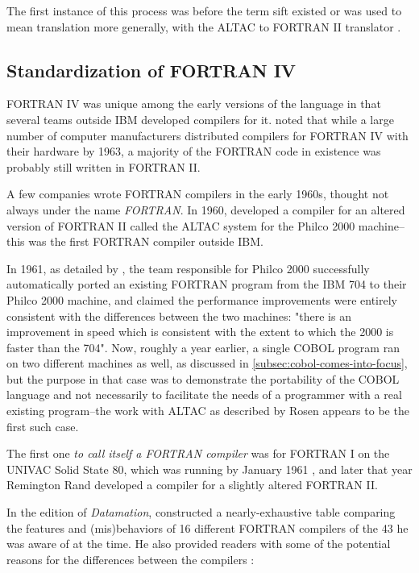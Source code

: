 The first instance of this process was before the term \gls{sift}
existed or was used to mean translation more generally, with
the ALTAC to FORTRAN II translator \cite{olsen_altac_fortranii_translator_1965}.

\subsection{Standardization of FORTRAN IV}

FORTRAN IV was unique among the early versions of the language in that
several teams outside IBM developed compilers for it.
\citeauthor{backus_heising_fortran_1964} noted that while a large number
of computer manufacturers distributed compilers for FORTRAN IV with
their hardware by 1963, a majority of the FORTRAN code in existence
was probably still written in FORTRAN II\cite{backus_heising_fortran_1964}.

A few companies wrote FORTRAN compilers in the early 1960s,
thought not always under the name \textit{FORTRAN}.
In 1960,  developed a compiler for
an altered version of FORTRAN II called the ALTAC system
for the Philco 2000 machine\cite{sammet_programming_languages_history_and_fundamentals_1969}--
this was the first FORTRAN compiler outside IBM.

In 1961, as detailed by \citeauthor{rosen_altac_fortran_1961},
the team responsible for Philco 2000 successfully automatically
ported an existing FORTRAN program from the IBM 704 to their Philco 2000
machine, and claimed the performance improvements were entirely consistent with
the differences between the two machines: "there is an improvement in speed which is consistent
with the extent to which the 2000 is faster than the 704"\cite{rosen_altac_fortran_1961}.
Now, roughly a year earlier, a single COBOL program ran on two different
machines as well, as discussed in \cref{subsec:cobol-comes-into-focus},
but the purpose in that case was to demonstrate the portability of the COBOL
language and not necessarily to facilitate the needs of a programmer with
a real existing program--the work with ALTAC as described by Rosen
appears to be the first such case.

The first one
\textit{to call itself a FORTRAN compiler} was for FORTRAN I
on the UNIVAC Solid State 80, which was running by January 1961
\cite{sammet_programming_languages_history_and_fundamentals_1969},
and later that year Remington Rand developed a compiler
for a slightly altered FORTRAN II.

In the  edition of \textit{Datamation},
\citeauthor{oswald_various_fortrans_datamation_1964}
constructed a nearly-exhaustive table comparing the features and (mis)behaviors of
16 different FORTRAN compilers of the 43 he was aware of at the time.
He also provided readers with some of the potential reasons for the
differences between the compilers
\cite{oswald_various_fortrans_datamation_1964}:

